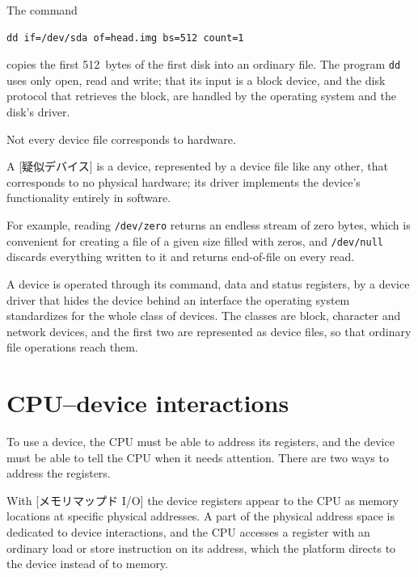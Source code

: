 \documentclass[../main.tex]{subfiles}
\begin{document}
\begin{example}
  The command
  \begin{lstlisting}[numbers=none]
dd if=/dev/sda of=head.img bs=512 count=1
\end{lstlisting}
  copies the first 512~bytes of the first disk into an ordinary file.  The
  program \texttt{dd} uses only open, read and write; that its input is a
  block device, and the disk protocol that retrieves the block, are handled
  by the operating system and the disk's driver.
\end{example}

Not every device file corresponds to hardware.

\begin{definition}
  A [疑似デバイス] is a device, represented by a device
  file like any other, that corresponds to no physical hardware; its driver
  implements the device's functionality entirely in software.
\end{definition}

For example, reading \texttt{/dev/zero} returns an endless stream of zero
bytes, which is convenient for creating a file of a given size filled with
zeros, and \texttt{/dev/null} discards everything written to it and returns
end-of-file on every read.

\begin{keypoint}
  A device is operated through its command, data and status registers, by a
  device driver that hides the device behind an interface the operating
  system standardizes for the whole class of devices.  The classes are block,
  character and network devices, and the first two are represented as device
  files, so that ordinary file operations reach them.
\end{keypoint}

\section{CPU--device interactions}
\label{sec:l11-interactions}

To use a device, the CPU must be able to address its registers, and the
device must be able to tell the CPU when it needs attention.  There
are two ways to address the registers.

\begin{definition}
  With [メモリマップド I/O] the device registers
  appear to the CPU as memory locations at specific physical addresses.  A
  part of the physical address space is dedicated to device interactions,
  and the CPU accesses a register with an ordinary load or store instruction
  on its address, which the platform directs to the device instead of to
  memory.
\end{definition}
\end{document}

